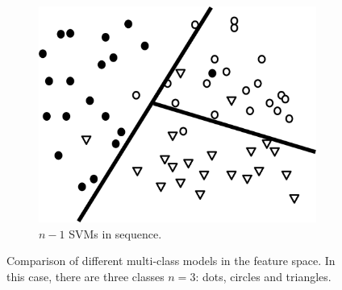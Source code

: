 \begin{figure}
\begin{subfigure}[b]{0.32\textwidth}
            \centering 
            \includegraphics[width=.98\textwidth]{parts/chap-2/img-2/svm-seq.png}
            \caption{$n-1$ SVMs in sequence.} 
            \label{mach:svm-model-gr-3}
        \end{subfigure}
        \caption{Comparison of different multi-class models in the feature space. In this case, there are three classes $n=3$: dots, circles and triangles.}
\end{figure}


\FloatBarrier